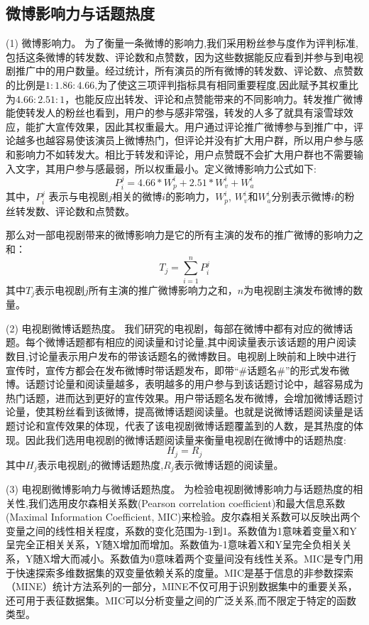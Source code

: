 \subsection{微博影响力与话题热度}
(1) 微博影响力。
为了衡量一条微博的影响力,我们采用粉丝参与度作为评判标准,包括这条微博的转发数、评论数和点赞数，因为这些数据能反应看到并参与到电视剧推广中的用户数量。经过统计，所有演员的所有微博的转发数、评论数、点赞数的比例是${1: 1.86: 4.66}$,为了使这三项评判指标具有相同重要程度,因此赋予其权重比为${4.66: 2.51: 1}$，也能反应出转发、评论和点赞能带来的不同影响力。转发推广微博能使转发人的粉丝也看到，用户的参与感非常强，转发的人多了就具有滚雪球效应，能扩大宣传效果，因此其权重最大。用户通过评论推广微博参与到推广中，评论越多也越容易使该演员上微博热门，但评论并没有扩大用户群，所以用户参与感和影响力不如转发大。相比于转发和评论，用户点赞既不会扩大用户群也不需要输入文字，其用户参与感最弱，所以权重最小。定义微博影响力公式如下:
\begin{equation}P_i^j = 4.66 * W_p^i + 2.51 * W_v^i + W_a^i\end{equation}
其中，$P_i^j$ 表示与电视剧$j$相关的微博$i$的影响力，$W_p^i$, $W_v^i$和$W_a^i$分别表示微博$i$的粉丝转发数、评论数和点赞数。

那么对一部电视剧带来的微博影响力是它的所有主演的发布的推广微博的影响力之和：
\begin{equation}T_j = \sum_{i=1}^n P_i^j\end{equation}
其中$T_j$表示电视剧$j$所有主演的推广微博影响力之和，$n$为电视剧主演发布微博的数量。

(2) 电视剧微博话题热度。
我们研究的电视剧，每部在微博中都有对应的微博话题。每个微博话题都有相应的阅读量和讨论量,其中阅读量表示该话题的用户阅读数目,讨论量表示用户发布的带该话题名的微博数目。电视剧上映前和上映中进行宣传时，宣传方都会在发布微博时带话题发布，即带“\#话题名\#”的形式发布微博。话题讨论量和阅读量越多，表明越多的用户参与到该话题讨论中，越容易成为热门话题，进而达到更好的宣传效果。用户带话题名发布微博，会增加微博话题讨论量，使其粉丝看到该微博，提高微博话题阅读量。也就是说微博话题阅读量是话题讨论和宣传效果的体现，代表了该电视剧微博话题覆盖到的人数，是其热度的体现。因此我们选用电视剧的微博话题阅读量来衡量电视剧在微博中的话题热度:
\begin{equation}H_j = R_j\end{equation}
其中$H_j$表示电视剧$j$的微博话题热度,$R_j$表示微博话题的阅读量。

(3) 电视剧微博影响力与微博话题热度。
为检验电视剧微博影响力与话题热度的相关性,我们选用皮尔森相关系数(Pearson correlation coefficient)和最大信息系数(Maximal Information Coefficient, MIC)来检验。皮尔森相关系数可以反映出两个变量之间的线性相关程度，系数的变化范围为-1到1。系数值为1意味着变量X和Y呈完全正相关关系，Y随X增加而增加。系数值为-1意味着X和Y呈完全负相关关系，Y随X增大而减小。系数值为0意味着两个变量间没有线性关系。MIC是专门用于快速探索多维数据集的双变量依赖关系的度量。MIC是基于信息的非参数探索（MINE）统计方法系列的一部分，MINE不仅可用于识别数据集中的重要关系，还可用于表征数据集。MIC可以分析变量之间的广泛关系,而不限定于特定的函数类型\cite{10}。

